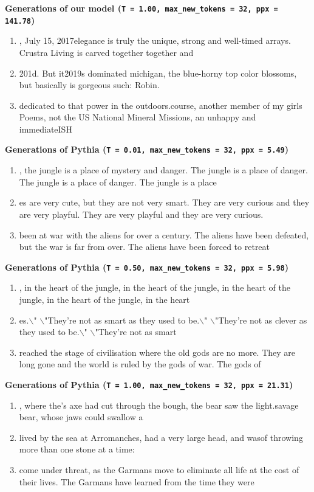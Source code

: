 \documentclass[11pt]{article}
\begin{document}
\textbf{Generations of our model (\texttt{T = 1.00, max\_new\_tokens = 32, ppx = 141.78})}
\begin{enumerate}
\item \nThursday, July 15, 2017\nThe elegance is truly the unique, strong and well-timed arrays. Crustra Living is carved together together and
\item \u201d. But it\u2019s dominated michigan, the blue-horny top color blossoms, but basically is gorgeous such: Robin.\ufffd
\item dedicated to that power in the outdoors.\nOf course, another member of my girls Poems, not the US National Mineral Missions, an unhappy and immediateISH
\end{enumerate}



\textbf{Generations of Pythia (\texttt{T = 0.01, max\_new\_tokens = 32, ppx = 5.49})}
\begin{enumerate}
\item , the jungle is a place of mystery and danger. The jungle is a place of danger. The jungle is a place of danger. The jungle is a place
\item es are very cute, but they are not very smart. They are very curious and they are very playful. They are very playful and they are very curious.
\item been at war with the aliens for over a century. The aliens have been defeated, but the war is far from over. The aliens have been forced to retreat
\end{enumerate}


\textbf{Generations of Pythia (\texttt{T = 0.50, max\_new\_tokens = 32, ppx = 5.98})}
\begin{enumerate}
\item , in the heart of the jungle, in the heart of the jungle, in the heart of the jungle, in the heart of the jungle, in the heart
\item es.$\backslash$" $\backslash$"They're not as smart as they used to be.$\backslash$" $\backslash$"They're not as clever as they used to be.$\backslash$" $\backslash$"They're not as smart
\item reached the stage of civilisation where the old gods are no more. They are long gone and the world is ruled by the gods of war. The gods of
\end{enumerate}


\textbf{Generations of Pythia (\texttt{T = 1.00, max\_new\_tokens = 32, ppx = 21.31})}
\begin{enumerate}
\item , where the\nlumberjack's axe had cut through the bough, the bear saw the light.\nThe savage bear, whose jaws could swallow a
\item \nwho lived by the sea at Arromanches, had a very large head, and was\ncapable of throwing more than one stone at a time:
\item come under threat, as the Garmans move to eliminate all life at the cost of their lives. The Garmans have learned from the time they were
\end{enumerate}
\end{document}
